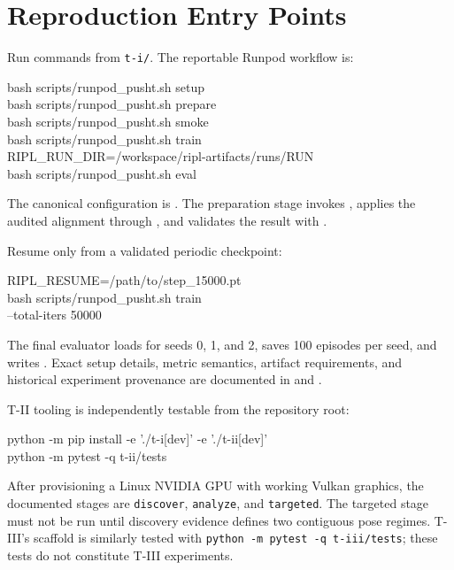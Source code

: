 \section{Reproduction Entry Points}
\label{sec:reproduction}

Run commands from \texttt{t-i/}. The reportable Runpod workflow is:
\par\noindent
\begin{minipage}{\linewidth}
\scriptsize\ttfamily
bash scripts/runpod\_pusht.sh setup\\
bash scripts/runpod\_pusht.sh prepare\\
bash scripts/runpod\_pusht.sh smoke\\
bash scripts/runpod\_pusht.sh train\\
RIPL\_RUN\_DIR=/workspace/ripl-artifacts/runs/RUN \\
\hspace*{1em}bash scripts/runpod\_pusht.sh eval
\end{minipage}

The canonical configuration is
. The preparation stage invokes
, applies the audited alignment through
, and validates the result with
.

Resume only from a validated periodic checkpoint:
\par\noindent
\begin{minipage}{\linewidth}
\scriptsize\ttfamily
RIPL\_RESUME=/path/to/step\_15000.pt \\
\hspace*{1em}bash scripts/runpod\_pusht.sh train \\
\hspace*{2em}--total-iters 50000
\end{minipage}

The final evaluator loads  for seeds 0, 1, and 2, saves
100 episodes per seed, and writes . Exact setup details,
metric semantics, artifact requirements, and historical experiment provenance are documented in
 and .

T-II tooling is independently testable from the repository root:
\par\noindent
\begin{minipage}{\linewidth}
\scriptsize\ttfamily
python -m pip install -e './t-i[dev]' -e './t-ii[dev]'\\
python -m pytest -q t-ii/tests
\end{minipage}

After provisioning a Linux NVIDIA GPU with working Vulkan graphics, the documented
 stages are \texttt{discover}, \texttt{analyze}, and
\texttt{targeted}. The targeted stage must not be run until discovery evidence defines two
contiguous pose regimes. T-III's scaffold is similarly tested with
\texttt{python -m pytest -q t-iii/tests}; these tests do not constitute T-III experiments.
